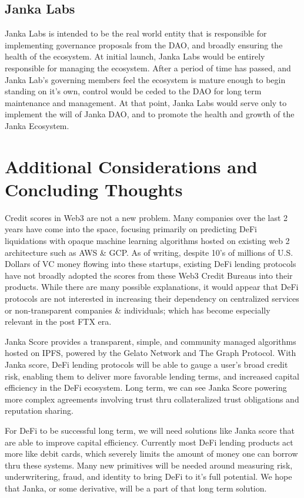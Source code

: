 \documentclass{article}
\begin{document}
\subsection{Janka Labs}
Janka Labs is intended to be the real world entity that is responsible for implementing governance proposals from the DAO, and broadly ensuring the health of the ecosystem. At initial launch, Janka Labs would be entirely responsible for managing the ecosystem. After a period of time has passed, and Janka Lab's governing members feel the ecosystem is mature enough to begin standing on it's own, control would be ceded to the DAO for long term maintenance and management. At that point, Janka Labs would serve only to implement the will of Janka DAO, and to promote the health and growth of the Janka Ecosystem.

\section{Additional Considerations and Concluding Thoughts}
Credit scores in Web3 are not a new problem. Many companies over the last 2 years have come into the space, focusing primarily on predicting DeFi liquidations with opaque machine learning algorithms hosted on existing web 2 architecture such as AWS \& GCP. As of writing, despite 10's of millions of U.S. Dollars of VC money flowing into these startups, existing DeFi lending protocols have not broadly adopted the scores from these Web3 Credit Bureaus into their products. While there are many possible explanations, it would appear that DeFi protocols are not interested in increasing their dependency on centralized services or non-transparent companies \& individuals; which has become especially relevant in the post FTX era.

Janka Score provides a transparent, simple, and community managed algorithms hosted on IPFS, powered by the Gelato Network and The Graph Protocol. With Janka score, DeFi lending protocols will be able to gauge a user's broad credit risk, enabling them to deliver more favorable lending terms, and increased capital efficiency in the DeFi ecosystem. Long term, we can see Janka Score powering more complex agreements involving trust thru collateralized trust obligations and reputation sharing. 

For DeFi to be successful long term, we will need solutions like Janka score that are able to improve capital efficiency. Currently most DeFi lending products act more like debit cards, which severely limits the amount of money one can borrow thru these systems. Many new primitives will be needed around measuring risk, underwritering, fraud, and identity to bring DeFi to it's full potential. We hope that Janka, or some derivative, will be a part of that long term solution. 
\end{document}
